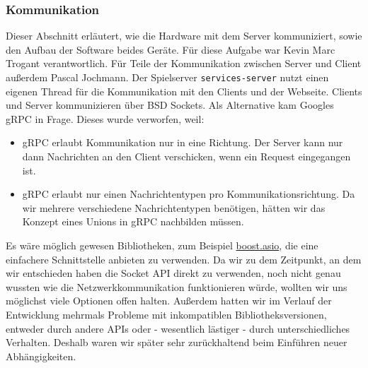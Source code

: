 \subsubsection{Kommunikation}
Dieser Abschnitt erläutert, wie die Hardware mit dem Server kommuniziert, sowie den Aufbau der Software beides Geräte.
Für diese Aufgabe war Kevin Marc Trogant verantwortlich. Für Teile der Kommunikation zwischen Server und Client außerdem Pascal Jochmann.
Der Spielserver \texttt{services-server} nutzt einen eigenen Thread für die Kommunikation mit den Clients und
der Webseite. Clients und Server kommunizieren über BSD Sockets.
Als Alternative kam Googles gRPC in Frage. Dieses wurde verworfen, weil:
\begin{itemize}
    \item gRPC erlaubt Kommunikation nur in eine Richtung. Der Server kann nur dann Nachrichten an den Client verschicken,  wenn ein Request eingegangen ist.
    \item gRPC erlaubt nur einen Nachrichtentypen pro Kommunikationsrichtung. Da wir mehrere verschiedene Nachrichtentypen benötigen, hätten wir das Konzept eines Unions in gRPC nachbilden müssen.
\end{itemize}
Es wäre möglich gewesen Bibliotheken, zum Beispiel \href{http://think-async.com/Asio/WebHome}{boost.asio}, die eine einfachere Schnittstelle anbieten zu verwenden. Da wir zu dem Zeitpunkt, an dem wir entschieden haben die Socket API direkt zu verwenden, noch nicht genau wussten wie die Netzwerkkommunikation funktionieren würde, wollten wir uns möglichst viele Optionen offen halten. Außerdem hatten wir im Verlauf der Entwicklung mehrmals Probleme mit inkompatiblen Bibliotheksversionen, entweder durch andere APIs oder - wesentlich lästiger - durch unterschiedliches Verhalten. Deshalb waren wir später sehr zurückhaltend beim Einführen neuer Abhängigkeiten.

